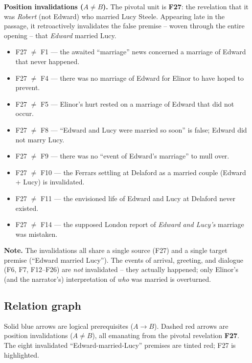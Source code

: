 \documentclass[11pt]{article}
\begin{document}
\noindent
\textbf{Position invalidations ($A \neq B$).} The pivotal unit is \textbf{F27}:
the revelation that it was \emph{Robert} (not Edward) who married Lucy Steele.
Appearing late in the passage, it retroactively invalidates the false premise --
woven through the entire opening -- that \emph{Edward} married Lucy.

\begin{itemize}[leftmargin=*]
  \item F27 $\neq$ F1 --- the awaited ``marriage'' news concerned a marriage of Edward that never happened.
  \item F27 $\neq$ F4 --- there was no marriage of Edward for Elinor to have hoped to prevent.
  \item F27 $\neq$ F5 --- Elinor's hurt rested on a marriage of Edward that did not occur.
  \item F27 $\neq$ F8 --- ``Edward and Lucy were married so soon'' is false; Edward did not marry Lucy.
  \item F27 $\neq$ F9 --- there was no ``event of Edward's marriage'' to mull over.
  \item F27 $\neq$ F10 --- the Ferrars settling at Delaford as a married couple (Edward + Lucy) is invalidated.
  \item F27 $\neq$ F11 --- the envisioned life of Edward and Lucy at Delaford never existed.
  \item F27 $\neq$ F14 --- the supposed London report of \emph{Edward and Lucy's} marriage was mistaken.
\end{itemize}

\noindent
\textbf{Note.} The invalidations all share a single source (F27) and a single
target premise (``Edward married Lucy''). The events of arrival, greeting, and
dialogue (F6, F7, F12--F26) are \emph{not} invalidated -- they actually happened;
only Elinor's (and the narrator's) interpretation of \emph{who} was married is
overturned.

\subsection*{Relation graph}

Solid blue arrows are logical prerequisites ($A \rightarrow B$). Dashed red
arrows are position invalidations ($A \neq B$), all emanating from the pivotal
revelation \textbf{F27}. The eight invalidated ``Edward-married-Lucy'' premises
are tinted red; F27 is highlighted.
\end{document}
